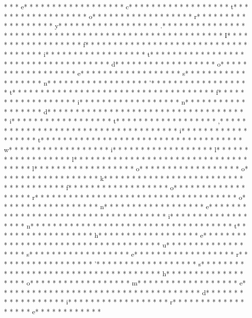 * *  * e* * *  * * *  * * *  *  * * *  *  * * *  * c* * *  * * *  * * *  *  * * *  *  * * *  * t* * *  * * *  * * *  *  * * *  *  * * *  * o* * *  * * *  * * *  *  * * *  *  * * *  * r* * *  * * *  * * *  *  * * *  *  * * *  * y* * *  * * *  * * *  *  * * *  *  * * *  * .* * *  * * *  * * *  *  * * *  *  * * *  *  * * *  * * *  * * *  *  * * *  *  * * *  * 
* * *  * * *  * * *  *  * * *  *  * * *  * I* * *  * * *  * * *  *  * * *  *  * * *  * f* * *  * * *  * * *  *  * * *  *  * * *  *  * * *  * * *  * * *  *  * * *  *  * * *  * i* * *  * * *  * * *  *  * * *  *  * * *  * t* * *  * * *  * * *  *  * * *  *  * * *  *  * * *  * * *  * * *  *  * * *  *  * * *  * d* * *  * * *  * * *  *  * * *  *  * * *  * o* * *  * * *  * * *  *  * * *  *  * * *  * e* * *  * * *  * * *  *  * * *  *  * * *  * s* * *  * * *  * * *  *  * * *  *  * * *  * n* * *  * * *  * * *  *  * * *  *  * * *  * '* * *  * * *  * * *  *  * * *  *  * * *  * t* * *  * * *  * * *  *  * * *  *  * * *  *  * * *  * * *  * * *  *  * * *  *  * * *  * f* * *  * * *  * * *  *  * * *  *  * * *  * i* * *  * * *  * * *  *  * * *  *  * * *  * n* * *  * * *  * * *  *  * * *  *  * * *  * d* * *  * * *  * * *  *  * * *  *  * * *  *  * * *  * * *  * * *  *  * * *  *  * * *  * i* * *  * * *  * * *  *  * * *  *  * * *  * t* * *  * * *  * * *  *  * * *  *  * * *  * ,* * *  * * *  * * *  *  * * *  *  * * *  *  * * *  * * *  * * *  *  * * *  *  * * *  * i* * *  * * *  * * *  *  * * *  *  * * *  * t* * *  * * *  * * *  *  * * *  *  * * *  *  * * *  * * *  * * *  *  * * *  *  * * *  * w* * *  * * *  * * *  *  * * *  *  * * *  * i* * *  * * *  * * *  *  * * *  *  * * *  * l* * *  * * *  * * *  *  * * *  *  * * *  * l* * *  * * *  * * *  *  * * *  *  * * *  *  * * *  * * *  * * *  *  * * *  *  * * *  * l* * *  * * *  * * *  *  * * *  *  * * *  * o* * *  * * *  * * *  *  * * *  *  * * *  * o* * *  * * *  * * *  *  * * *  *  * * *  * k* * *  * * *  * * *  *  * * *  *  * * *  *  * * *  * * *  * * *  *  * * *  *  * * *  * f* * *  * * *  * * *  *  * * *  *  * * *  * o* * *  * * *  * * *  *  * * *  *  * * *  * r* * *  * * *  * * *  *  * * *  *  * * *  *  * * *  * * *  * * *  *  * * *  *  * * *  * o* * *  * * *  * * *  *  * * *  *  * * *  * n* * *  * * *  * * *  *  * * *  *  * * *  * e* * *  * * *  * * *  *  * * *  *  * * *  *  * * *  * * *  * * *  *  * * *  *  * * *  * i* * *  * * *  * * *  *  * * *  *  * * *  * n* * *  * * *  * * *  *  * * *  *  * * *  *  * * *  * * *  * * *  *  * * *  *  * * *  * t* * *  * * *  * * *  *  * * *  *  * * *  * h* * *  * * *  * * *  *  * * *  *  * * *  * e* * *  * * *  * * *  *  * * *  *  * * *  *  * * *  * * *  * * *  *  * * *  *  * * *  * u* * *  * * *  * * *  *  * * *  *  * * *  * s* * *  * * *  * * *  *  * * *  *  * * *  * e* * *  * * *  * * *  *  * * *  *  * * *  * r* * *  * * *  * * *  *  * * *  *  * * *  * '* * *  * * *  * * *  *  * * *  *  * * *  * s* * *  * * *  * * *  *  * * *  *  * * *  *  * * *  * * *  * * *  *  * * *  *  * * *  * h* * *  * * *  * * *  *  * * *  *  * * *  * o* * *  * * *  * * *  *  * * *  *  * * *  * m* * *  * * *  * * *  *  * * *  *  * * *  * e* * *  * * *  * * *  *  * * *  *  * * *  *  * * *  * * *  * * *  *  * * *  *  * * *  * d* * *  * * *  * * *  *  * * *  *  * * *  * i* * *  * * *  * * *  *  * * *  *  * * *  * r* * *  * * *  * * *  *  * * *  *  * * *  * e* * *  * * *  * * *  *  * * 